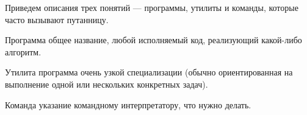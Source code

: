 Приведем описания трех понятий --- программы, утилиты и команды, которые часто вызывают путанницу.

\begin{defi}{Программа} 
	общее название, любой исполняемый код, реализующий какой-либо алгоритм.
\end{defi}

\begin{defi}{Утилита} 
	программа очень узкой специализации (обычно ориентированная на выполнение одной или нескольких конкретных задач).
\end{defi}

\begin{defi}{Команда} 
	указание командному интерпретатору, что нужно делать.
\end{defi}